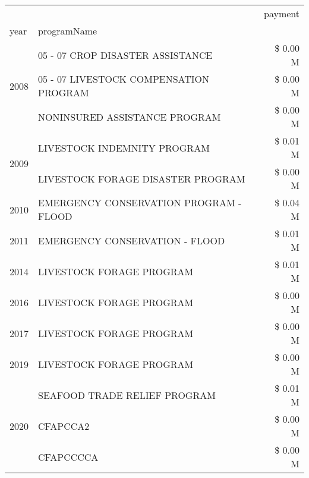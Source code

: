 \begin{tabular}{llr}
\toprule
 &  & payment \\
year & programName &  \\
\midrule
\multirow[t]{3}{*}{2008} & 05 - 07 CROP DISASTER ASSISTANCE & \$ 0.00 M \\
 & 05 - 07 LIVESTOCK COMPENSATION PROGRAM & \$ 0.00 M \\
 & NONINSURED ASSISTANCE PROGRAM & \$ 0.00 M \\
\cline{1-3}
\multirow[t]{2}{*}{2009} & LIVESTOCK INDEMNITY PROGRAM & \$ 0.01 M \\
 & LIVESTOCK FORAGE DISASTER  PROGRAM & \$ 0.00 M \\
\cline{1-3}
2010 & EMERGENCY CONSERVATION PROGRAM - FLOOD & \$ 0.04 M \\
\cline{1-3}
2011 & EMERGENCY CONSERVATION - FLOOD & \$ 0.01 M \\
\cline{1-3}
2014 & LIVESTOCK FORAGE PROGRAM & \$ 0.01 M \\
\cline{1-3}
2016 & LIVESTOCK FORAGE PROGRAM                      & \$ 0.00 M \\
\cline{1-3}
2017 & LIVESTOCK FORAGE PROGRAM & \$ 0.00 M \\
\cline{1-3}
2019 & LIVESTOCK FORAGE PROGRAM & \$ 0.00 M \\
\cline{1-3}
\multirow[t]{3}{*}{2020} & SEAFOOD TRADE RELIEF PROGRAM & \$ 0.01 M \\
 & CFAPCCA2 & \$ 0.00 M \\
 & CFAPCCCCA & \$ 0.00 M \\
\cline{1-3}
\bottomrule
\end{tabular}
